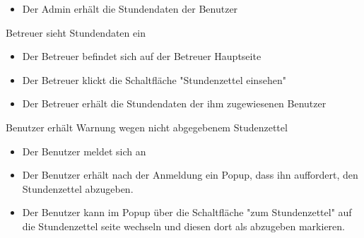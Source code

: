 \begin{requirements}
\begin{itemize}
		\item Der Admin erhält die Stundendaten der Benutzer
	\end {itemize}
	 Betreuer sieht Stundendaten ein
	\begin{itemize}
		\item Der Betreuer befindet sich auf der Betreuer Hauptseite
		\item Der Betreuer klickt die Schaltfläche "Stundenzettel einsehen"
		\item Der Betreuer erhält die Stundendaten der ihm zugewiesenen Benutzer
	\end {itemize}
	 Benutzer erhält Warnung wegen nicht abgegebenem Studenzettel
            \begin{itemize}
		\item Der Benutzer meldet sich an
		\item Der Benutzer erhält nach der Anmeldung ein Popup, dass ihn auffordert, den Stundenzettel abzugeben.
		\item Der Benutzer kann im Popup über die Schaltfläche "zum Stundenzettel" auf die Stundenzettel seite wechseln und diesen dort als abzugeben markieren.
	\end {itemize}

\end{requirements}